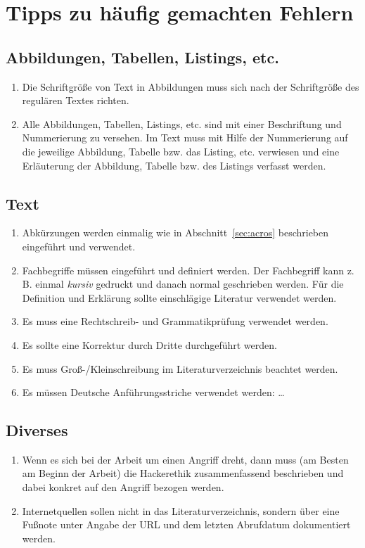
\section{Tipps zu häufig gemachten Fehlern}

\subsection{Abbildungen, Tabellen, Listings, etc.}
\begin{enumerate}
 \item Die Schriftgröße von Text in Abbildungen muss sich nach der Schriftgröße
 des regulären Textes richten.
 \item Alle Abbildungen, Tabellen, Listings, etc. sind mit einer Beschriftung
 und Nummerierung zu versehen. Im Text muss mit Hilfe der Nummerierung auf
 die jeweilige Abbildung, Tabelle bzw. das Listing, etc. verwiesen und eine
 Erläuterung der Abbildung, Tabelle bzw. des Listings verfasst werden.
\end{enumerate}

\subsection{Text}
\begin{enumerate}
 \item Abkürzungen werden einmalig wie in Abschnitt~\ref{sec:acros} beschrieben eingeführt
 und verwendet.
 \item Fachbegriffe müssen eingeführt und definiert werden. Der Fachbegriff kann
 z. B. einmal \textit{kursiv} gedruckt und danach normal geschrieben werden. Für
 die Definition und Erklärung sollte einschlägige Literatur verwendet werden.
 \item Es muss eine Rechtschreib- und Grammatikprüfung verwendet werden.
 \item Es sollte eine Korrektur durch Dritte durchgeführt werden.
 \item Es muss Groß-/Kleinschreibung im Literaturverzeichnis beachtet werden.
 \item Es müssen Deutsche Anführungsstriche verwendet werden: \glqq \dots\grqq
\end{enumerate}

\subsection{Diverses}
\begin{enumerate}
 \item Wenn es sich bei der Arbeit um einen Angriff dreht, dann muss
 (am Besten am Beginn der Arbeit) die Hackerethik zusammenfassend beschrieben
 und dabei konkret auf den Angriff bezogen werden.
 \item Internetquellen sollen nicht in das Literaturverzeichnis, sondern über
 eine Fußnote unter Angabe der URL und dem letzten Abrufdatum dokumentiert
 werden.
\end{enumerate}
